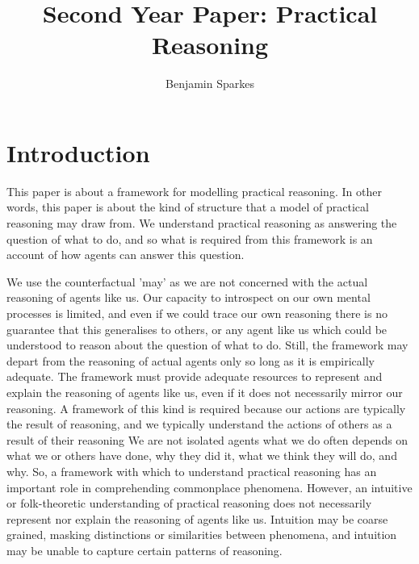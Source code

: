\documentclass[10pt]{article}
\title{Second Year Paper: Practical Reasoning}
\author{Benjamin Sparkes}
\begin{document}
\singlespacing

\maketitle

\section{Introduction}
\label{sec:intr-prel}

This paper is about a framework for modelling practical reasoning.
In other words, this paper is about the kind of structure that a model of practical reasoning may draw from.
We understand practical reasoning as answering the question of what to do, and so what is required from this framework is an account of how agents can answer this question.

We use the counterfactual 'may' as we are not concerned with the actual reasoning of agents like us.
Our capacity to introspect on our own mental processes is limited, and even if we could trace our own reasoning there is no guarantee that this generalises to others, or any agent like us which could be understood to reason about the question of what to do.
Still, the framework may depart from the reasoning of actual agents only so long as it is empirically adequate.
The framework must provide adequate resources to represent and explain the reasoning of agents like us, even if it does not necessarily mirror our reasoning.
A framework of this kind is required because our actions are typically the result of reasoning, and we typically understand the actions of others as a result of their reasoning
We are not isolated agents what we do often depends on what we or others have done, why they did it, what we think they will do, and why.
So, a framework with which to understand practical reasoning has an important role in comprehending commonplace phenomena.
However, an intuitive or folk-theoretic understanding of practical reasoning does not necessarily represent nor explain the reasoning of agents like us.
Intuition may be coarse grained, masking distinctions or similarities between phenomena, and intuition may be unable to capture certain patterns of reasoning.
\end{document}
